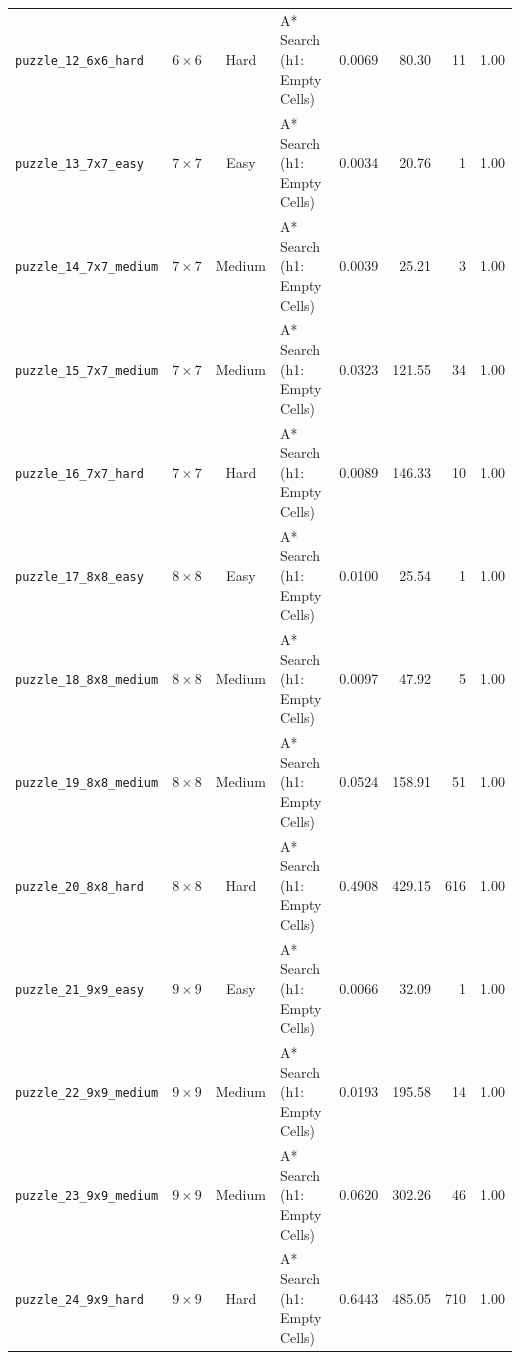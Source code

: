\documentclass{article}
\begin{document}
\begin{longtable}{@{}lccl r r r c@{}}
  \texttt{puzzle\_12\_6x6\_hard} & $6\times6$ & Hard & A* Search (h1: Empty Cells) & 0.0069 & 80.30 & 11 & 1.00 \\
  \texttt{puzzle\_13\_7x7\_easy} & $7\times7$ & Easy & A* Search (h1: Empty Cells) & 0.0034 & 20.76 & 1 & 1.00 \\
  \texttt{puzzle\_14\_7x7\_medium} & $7\times7$ & Medium & A* Search (h1: Empty Cells) & 0.0039 & 25.21 & 3 & 1.00 \\
  \texttt{puzzle\_15\_7x7\_medium} & $7\times7$ & Medium & A* Search (h1: Empty Cells) & 0.0323 & 121.55 & 34 & 1.00 \\
  \texttt{puzzle\_16\_7x7\_hard} & $7\times7$ & Hard & A* Search (h1: Empty Cells) & 0.0089 & 146.33 & 10 & 1.00 \\
  \texttt{puzzle\_17\_8x8\_easy} & $8\times8$ & Easy & A* Search (h1: Empty Cells) & 0.0100 & 25.54 & 1 & 1.00 \\
  \texttt{puzzle\_18\_8x8\_medium} & $8\times8$ & Medium & A* Search (h1: Empty Cells) & 0.0097 & 47.92 & 5 & 1.00 \\
  \texttt{puzzle\_19\_8x8\_medium} & $8\times8$ & Medium & A* Search (h1: Empty Cells) & 0.0524 & 158.91 & 51 & 1.00 \\
  \texttt{puzzle\_20\_8x8\_hard} & $8\times8$ & Hard & A* Search (h1: Empty Cells) & 0.4908 & 429.15 & 616 & 1.00 \\
  \texttt{puzzle\_21\_9x9\_easy} & $9\times9$ & Easy & A* Search (h1: Empty Cells) & 0.0066 & 32.09 & 1 & 1.00 \\
  \texttt{puzzle\_22\_9x9\_medium} & $9\times9$ & Medium & A* Search (h1: Empty Cells) & 0.0193 & 195.58 & 14 & 1.00 \\
  \texttt{puzzle\_23\_9x9\_medium} & $9\times9$ & Medium & A* Search (h1: Empty Cells) & 0.0620 & 302.26 & 46 & 1.00 \\
  \texttt{puzzle\_24\_9x9\_hard} & $9\times9$ & Hard & A* Search (h1: Empty Cells) & 0.6443 & 485.05 & 710 & 1.00 \\
\end{longtable}
\end{document}
